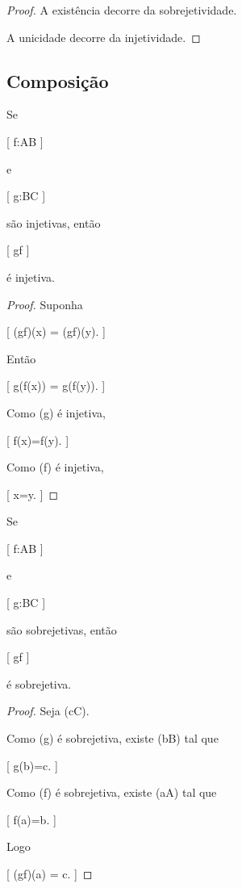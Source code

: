 \documentclass[../../main]{subfiles}
\begin{document}
\begin{proof}

	A existência decorre da sobrejetividade.

	A unicidade decorre da injetividade.

\end{proof}

\subsection{Composição}

\begin{prop}
	\label{prop:matematica:funcoes:tipos-de-funcoes:composicao-injetiva}

	Se

		[
			f:A\to B
		]

	e

		[
			g:B\to C
		]

	são injetivas, então

	[
	g\circ f
	]

	é injetiva.

\end{prop}

\begin{proof}

	Suponha

	[
	(g\circ f)(x)
	=
	(g\circ f)(y).
	]

	Então

	[
	g(f(x))
	=
	g(f(y)).
	]

	Como (g) é injetiva,

	[
			f(x)=f(y).
		]

	Como (f) é injetiva,

	[
			x=y.
		]

\end{proof}

\begin{prop}
	\label{prop:matematica:funcoes:tipos-de-funcoes:composicao-sobrejetiva}

	Se

		[
			f:A\to B
		]

	e

		[
			g:B\to C
		]

	são sobrejetivas, então

	[
	g\circ f
	]

	é sobrejetiva.

\end{prop}

\begin{proof}

	Seja (c\in C).

	Como (g) é sobrejetiva, existe
	(b\in B) tal que

		[
			g(b)=c.
		]

	Como (f) é sobrejetiva, existe
	(a\in A) tal que

		[
			f(a)=b.
		]

	Logo

		[
			(g\circ f)(a)
			=
			c.
		]

\end{proof}
\end{document}

